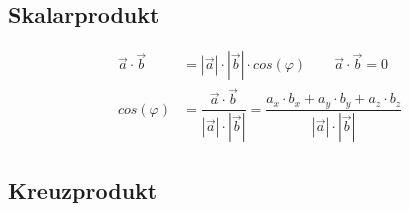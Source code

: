 


\subsection{Skalarprodukt}
\begin{align*}
	\vec{a} \cdot \vec{b} & = |\vec{a}| \cdot |\vec{b}| \cdot cos(\varphi) \qquad \vec{a} \cdot \vec{b}  = 0\\
	cos(\varphi)          &  = \dfrac{\vec{a} \cdot \vec{b}}{|\vec{a}| \cdot |\vec{b}|} = \dfrac{a_x \cdot b_x + a_y \cdot b_y + a_z \cdot b_z}{|\vec{a}| \cdot |\vec{b}|}
\end{align*}

\subsection{Kreuzprodukt}

